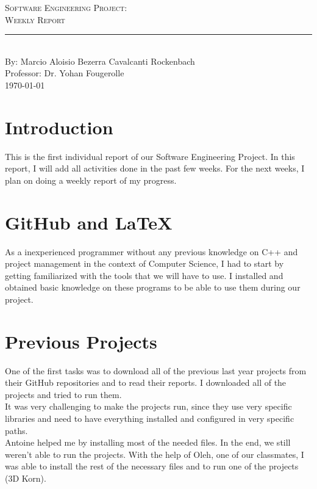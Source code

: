 \documentclass[aps,letterpaper,11pt]{revtex4}
\newcommand{\labno}{Software Engineering Project}
\newcommand{\labtitle}{Weekly Report}
\newcommand{\authorname}{Marcio Aloisio Bezerra Cavalcanti Rockenbach}
\newcommand{\professor}{Dr. Yohan Fougerolle}
\begin{document}
  
\begin{titlepage}
\begin{center}
{\LARGE \textsc{\labno:} \\ \vspace{4pt}}
{\Large \textsc{\labtitle} \\ \vspace{4pt}} 
\rule[13pt]{\textwidth}{1pt} \\ \vspace{150pt}
{\large By: \authorname \\ \vspace{10pt}
Professor: \professor \\ \vspace{10pt}
\today}
\end{center}


\end{titlepage}%
\newpage
\section {Introduction}
\setlength{\parindent}{5ex}
This is the first individual report of our Software Engineering Project. In this report, I will add all activities done in the past few weeks. For the next weeks, I plan on doing a weekly report of my progress.\\
\section{GitHub and LaTeX}
As a inexperienced programmer without any previous knowledge on C++ and project management in the context of Computer Science, I had to start by getting familiarized with the tools that we will have to use. I installed and obtained basic knowledge on these programs to be able to use them during our project.\\
\section{Previous Projects}
One of the first tasks was to download all of the previous last year projects from their GitHub repositories and to read their reports. I downloaded all of the projects and tried to run them.\\
\indent It was very challenging to make the projects run, since they use very specific libraries and need to have everything installed and configured in very specific paths.\\
Antoine helped me by installing most of the needed files. In the end, we still weren't able to run the projects. With the help of Oleh, one of our classmates, I was able to install the rest of the necessary files and to run one of the projects (3D Korn).\\
\end{document}
